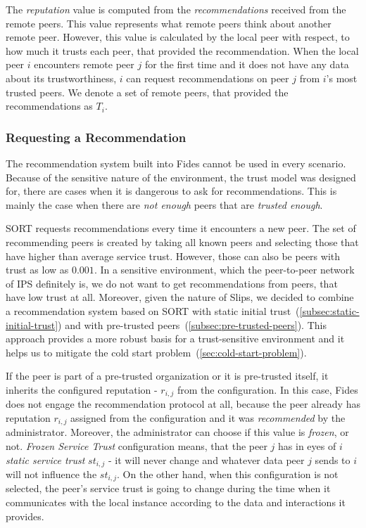 The \textit{reputation} value is computed from the \textit{recommendations} received from the remote peers. This value represents what remote peers think about another remote peer. However, this value is calculated by the local peer with respect, to how much it trusts each peer, that provided the recommendation.
When the local peer $i$ encounters remote peer $j$ for the first time and it does not have any data about its trustworthiness, $i$ can request recommendations on peer $j$ from $i$'s most trusted peers.
We denote a set of remote peers, that provided the recommendations as $T_{i}$.

\subsubsection{Requesting a Recommendation}
\label{subsubsec:requesting-recommendation}
The recommendation system built into Fides cannot be used in every scenario.
Because of the sensitive nature of the environment, the trust model was designed for, there are cases when it is dangerous to ask for recommendations.
This is mainly the case when there are \textit{not enough} peers that are \textit{trusted enough}.

SORT requests recommendations every time it encounters a new peer. The set of recommending peers is created by taking all known peers and selecting those that have higher than average service trust.
However, those can also be peers with trust as low as $0.001$. In a sensitive environment, which the peer-to-peer network of IPS definitely is, we do not want to get recommendations from peers, that have low trust at all.
Moreover, given the nature of Slips, we decided to combine a recommendation system based on SORT with static initial trust~(\ref{subsec:static-initial-trust}) and with pre-trusted peers~(\ref{subsec:pre-trusted-peers}).
This approach provides a more robust basis for a trust-sensitive environment and it helps us to mitigate the cold start problem~(\ref{sec:cold-start-problem}).

If the peer is part of a pre-trusted organization or it is pre-trusted itself, it inherits the configured reputation - $r_{i, j}$ from the configuration.
In this case, Fides does not engage the recommendation protocol at all, because the peer already has reputation $r_{i,j}$ assigned from the configuration and it was \textit{recommended} by the administrator.
Moreover, the administrator can choose if this value is \textit{frozen}, or not. 
\textit{Frozen Service Trust} configuration means, that the peer $j$ has in eyes of $i$ \textit{static service trust} $st_{i, j}$ - it will never change and whatever data peer $j$ sends to $i$ will not influence the $st_{i,j}$.
On the other hand, when this configuration is not selected, the peer's service trust is going to change during the time when it communicates with the local instance according to the data and interactions it provides.

